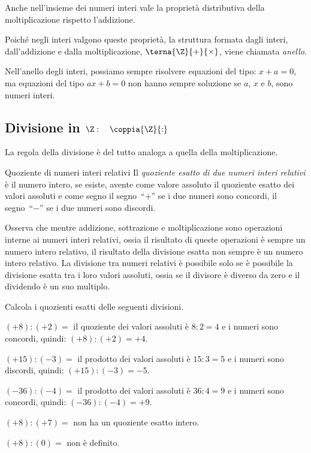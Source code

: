 Anche nell'insieme dei numeri interi vale la proprietà distributiva della
moltiplicazione rispetto l'addizione.

\bigskip
Poiché negli interi valgono queste proprietà, la struttura formata dagli 
interi, dall'addizione e dalla moltiplicazione, \(\terna{\Z}{+}{\times}\),
viene chiamata \emph{anello}.

Nell'anello degli interi, possiamo sempre risolvere equazioni del tipo:
\(x + a = 0\), ma equazioni del tipo \(ax + b = 0\) non hanno sempre 
soluzione se \(a\), \(x\) e \(b\), sono numeri interi.


\subsection{Divisione in $\Z: \quad \coppia{\Z}{:}$}

La regola della divisione è del tutto analoga a quella della 
moltiplicazione.

\begin{definizione}{Quoziente di numeri interi relativi}{}
Il \emph{quoziente esatto di due numeri interi relativi} è il numero intero, 
se esiste, avente come valore assoluto il quoziente esatto dei valori 
assoluti e come segno 
il segno~``\(+\)'' se i due numeri sono concordi,
il segno~``\(-\)'' se i due numeri sono discordi.
\end{definizione}

Osserva che mentre addizione, sottrazione e moltiplicazione sono operazioni 
interne ai numeri interi relativi, ossia il risultato di queste operazioni 
è sempre un numero intero relativo, il risultato della divisione esatta non 
sempre è un numero intero relativo. 
La divisione tra numeri relativi è possibile solo se è possibile la divisione 
esatta tra i loro valori assoluti, ossia se
il divisore è diverso da zero e il dividendo è un suo multiplo.

\begin{esempio}{}{}
Calcola i quozienti esatti delle seguenti divisioni.
\begin{enumeratea}
\item \((+8) : (+2)=\) 
il quoziente dei valori assoluti è \(8 : 2 = 4\) 
e i numeri sono concordi, quindi: \((+8) : (+2) = +4\).
\item \((+15) : (-3) =\) 
il prodotto dei valori assoluti è \(15 : 3 = 5\) 
e i numeri sono discordi, quindi: \((+15) : (-3) = -5\).
\item \((-36) : (-4) =\) 
il prodotto dei valori assoluti è \(36 : 4 = 9\) 
e i numeri sono concordi, quindi: \((-36) : (-4) = +9\).
\item \((+8) : (+7) =\) non ha un quoziente esatto intero.
\item \((+8) : (0) =\) non è definito.
\end{enumeratea}
\end{esempio}

